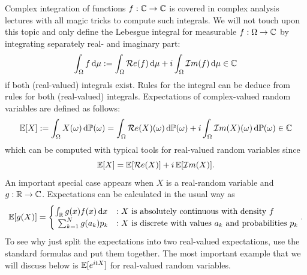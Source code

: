 	Complex integration of functions $f:\mathbb{C}\to\mathbb{C}$ is covered in complex analysis lectures with all magic tricks to compute such integrals. We will not touch upon this topic and only define the Lebesgue integral for measurable $f:\Omega\to \mathbb{C}$ by integrating separately real- and imaginary part:
	\begin{align*}
		\int_{\Omega} f \, \mathrm{d} \mu := \int_{\Omega} \mathcal{R}e(f) \, \mathrm{d} \mu + i  \int_{\Omega} \mathcal{I}m(f) \, \mathrm{d} \mu\in \mathbb{C}
	\end{align*}	
	if both (real-valued) integrals exist. Rules for the integral can be deduce from rules for both (real-valued) integrals. Expectations of complex-valued random variables are defined as follows: $$\mathbb{E}[X]:=\int_\Omega X(\omega)\, \mathrm{d} \mathbb P(\omega)=\int_\Omega \mathcal{R}e(X)(\omega)\, \mathrm{d} \mathbb P(\omega)+i\int_\Omega \mathcal{I}m(X)(\omega)\, \mathrm{d} \mathbb P(\omega)\in \mathbb{C}$$ which can be computed with typical tools for real-valued random variables since $$\mathbb{E}[X]=\mathbb{E}[\mathcal{R}e(X)]+i\,\mathbb{E}[\mathcal{I}m(X)].$$
	An important special case appears when $X$ is a real-random variable and $g:\mathbb{R}\to\mathbb{C}$. Expectations can be calculated in the usual way as
	\begin{align}\label{expec}
		\mathbb{E}[g(X)]=\begin{cases}
			\int_{\mathbb{R}} g(x) f(x)\, \mathrm{d} x&: X\text{ is absolutely continuous with density }f\\
			\ \sum_{k=1}^N g(a_k)p_k&: X\text{ is discrete with values }a_k \text{ and probabilities }p_k
		\end{cases}.
	\end{align}
	To see why just split the expectations into two real-valued expectations, use the standard formulas and put them together. The most important example that we will discuss below is $\mathbb{E}[e^{itX}]$ for real-valued random variables.	





